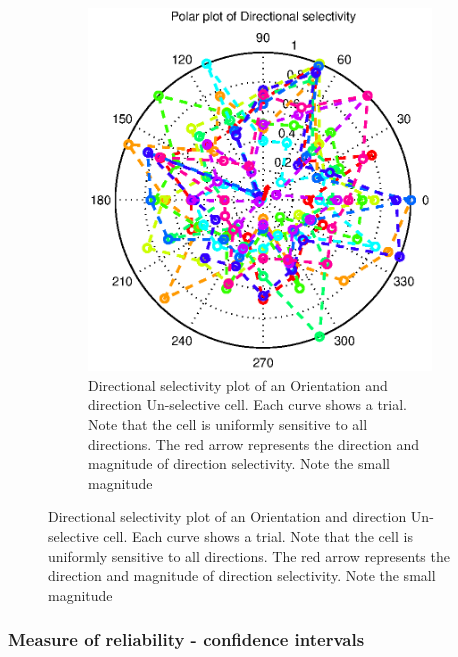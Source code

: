 \documentclass[11pt]{article}
\begin{document}
\begin{enumerate}
\begin{figure}
\begin{subfigure}{.48\textwidth}
            \centering
            \includegraphics[width=\linewidth]{plots/min_cirvar_dir}
            \caption{Directional selectivity plot of an Orientation and direction Un-selective cell. Each curve shows a trial. Note that the cell is uniformly sensitive to all directions. The red arrow represents the direction and magnitude of direction selectivity. Note the small magnitude}
        \end{subfigure}
    \end{figure}
\end{enumerate}

\subsubsection{Measure of reliability - confidence intervals} %
\label{ssub:measure_of_reliability_confidence_intervals}

\FloatBarrier
\end{document}
